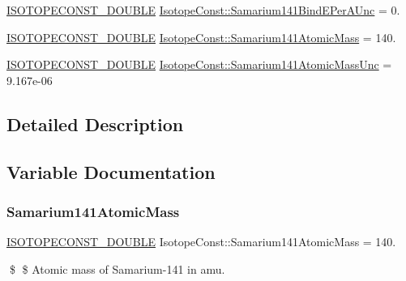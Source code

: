 \begin{DoxyCompactItemize}
\mbox{\hyperlink{group___isotope_const-_macros_ga8f45a7272ce02c0b4c65c44636ed719a}{I\+S\+O\+T\+O\+P\+E\+C\+O\+N\+S\+T\+\_\+\+D\+O\+U\+B\+LE}} \mbox{\hyperlink{group___isotope_const-_samarium-_sm141_gad2759ae319a8d1f43146fe86b52e208a}{Isotope\+Const\+::\+Samarium141\+Bind\+E\+Per\+A\+Unc}} = 0.
\item 
\mbox{\hyperlink{group___isotope_const-_macros_ga8f45a7272ce02c0b4c65c44636ed719a}{I\+S\+O\+T\+O\+P\+E\+C\+O\+N\+S\+T\+\_\+\+D\+O\+U\+B\+LE}} \mbox{\hyperlink{group___isotope_const-_samarium-_sm141_gaa54b9b55184ed6992315e16e63760672}{Isotope\+Const\+::\+Samarium141\+Atomic\+Mass}} = 140.
\item 
\mbox{\hyperlink{group___isotope_const-_macros_ga8f45a7272ce02c0b4c65c44636ed719a}{I\+S\+O\+T\+O\+P\+E\+C\+O\+N\+S\+T\+\_\+\+D\+O\+U\+B\+LE}} \mbox{\hyperlink{group___isotope_const-_samarium-_sm141_ga7621dfbf9de56d06dba920caaf6be192}{Isotope\+Const\+::\+Samarium141\+Atomic\+Mass\+Unc}} = 9.\+167e-\/06
\end{DoxyCompactItemize}


\subsection{Detailed Description}


\subsection{Variable Documentation}
\mbox{\label{group___isotope_const-_samarium-_sm141_gaa54b9b55184ed6992315e16e63760672}} 
\subsubsection{\texorpdfstring{Samarium141\+Atomic\+Mass}{Samarium141AtomicMass}}
{\footnotesize\ttfamily \mbox{\hyperlink{group___isotope_const-_macros_ga8f45a7272ce02c0b4c65c44636ed719a}{I\+S\+O\+T\+O\+P\+E\+C\+O\+N\+S\+T\+\_\+\+D\+O\+U\+B\+LE}} Isotope\+Const\+::\+Samarium141\+Atomic\+Mass = 140.}

\$ \$ Atomic mass of Samarium-\/141 in amu. \mbox{\label{group___isotope_const-_samarium-_sm141_ga7621dfbf9de56d06dba920caaf6be192}} 
